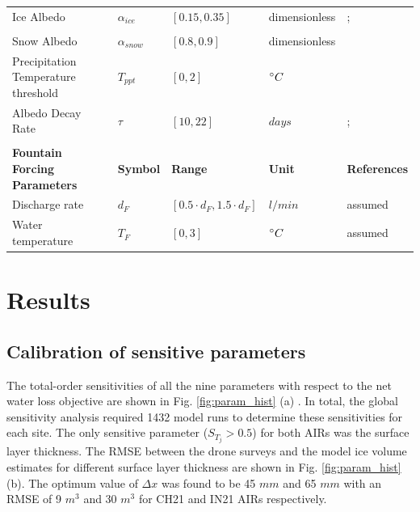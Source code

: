 \documentclass[utf8]{frontiersSCNS}
\begin{document}
\begin{table}
\begin{tabular}{lllll}
    Ice Albedo                          & $\alpha_{ice}$        & $[0.15,0.35]$         & dimensionless  &
    \citeauthor{steiner_2015};            \\
    & &    &  & \citeauthor{ZollesMaussion_2019}      \\
    Snow Albedo                         & $\alpha_{snow}$       & $[0.8,0.9]$        & dimensionless  & \citeauthor{ZollesMaussion_2019}              \\
    Precipitation Temperature threshold & $T_{ppt}$             & $[0,2]$            & $\degree C$& \citeauthor{Zhou_2010}  \\
    Albedo Decay Rate                   & $\tau$                & $[10,22]$           & $days$ &
    \citeauthor{Schmidt_2017};      \\
    & &    &  & \citeauthor{OerlemansKnap_1998}      \\\midrule
		\textbf{Fountain Forcing Parameters} & \textbf{Symbol} & \textbf{Range} & \textbf{Unit} & \textbf{References} \\
    Discharge rate & $d_{F}$             & $[0.5 \cdot d_{F},1.5 \cdot d_{F}]$            & $l/min$& assumed  \\
    Water temperature & $T_{F}$             & $[0,3]$            & $\degree C$  & assumed  \\\bottomrule
	\end{tabular}
\end{table}

\section{Results}

\subsection{Calibration of sensitive parameters}

The total-order sensitivities of all the nine parameters with respect to the net water loss objective are shown
in Fig. \ref{fig:param_hist} (a) . In total, the global sensitivity analysis required 1432 model runs to determine
these sensitivities for each site. The only sensitive parameter ($S_{T_{j}} > 0.5$) for both AIRs was the
surface layer thickness. The RMSE between the drone surveys and the model ice volume estimates for different
surface layer thickness are shown in Fig. \ref{fig:param_hist} (b). The optimum value of $\Delta x$ was found to
be 45 $mm$ and 65 $mm$ with an RMSE of 9 $m^3$ and 30 $m^3$ for CH21 and IN21 AIRs respectively.
\end{document}
